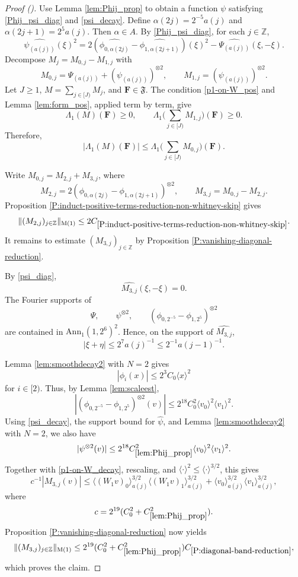 \documentclass[12pt,reqno]{amsart}
\newcommand{\auto}{{({\tiny\faCar})}}
\theoremstyle{plain}
\numberwithin{equation}{section}
\theoremstyle{remark}
\newcommand{\Z}{{\mathbb Z}}
\newcommand{\F}{\mathbf{F}}
\begin{document}
\begin{proof}[Proof \auto]
Use Lemma \ref{lem:Phij_prop} to obtain a function $\psi$ satisfying \eqref{Phij_psi_diag} and \eqref{psi_decay}. Define $\alpha(2j)=2^{-5}a(j)$ and $\alpha(2j+1)=2^5a(j)$. Then $\alpha\in A$. By \eqref{Phij_psi_diag}, for each $j\in\Z$,
\begin{equation}\label{psi_diag}
\widehat{\psi_{(a(j))}}(\xi)^2
=2(\widehat{\phi_{0,\alpha(2j)}}-\widehat{\phi_{1,\alpha(2j+1)}})(\xi)^2
-\widehat{\Psi_{(a(j))}}(\xi,-\xi).
\end{equation}
Decompose $M_j=M_{0,j}-M_{1,j}$ with
\[
M_{0,j}=\Psi_{(a(j))}+(\psi_{(a(j))})^{\otimes2},
\qquad
M_{1,j}=(\psi_{(a(j))})^{\otimes2}.
\]
Let $J\ge1$, $M=\sum_{j\in[J)}M_j$, and $\F\in\mathfrak F$. The condition \eqref{p1-on-W_pos} and Lemma \ref{lem:form_pos}, applied term by term, give
\[
\Lambda_1(M)(\F)\ge0,
\qquad
\Lambda_1\Big(\sum_{j\in[J)}M_{1,j}\Big)(\F)\ge0.
\]
Therefore,
\begin{equation}\label{K0_split}
|\Lambda_1(M)(\F)|
\le\Lambda_1\Big(\sum_{j\in[J)}M_{0,j}\Big)(\F).
\end{equation}

Write $M_{0,j}=M_{2,j}+M_{3,j}$, where
\[
M_{2,j}=2(\phi_{0,\alpha(2j)}-\phi_{1,\alpha(2j+1)})^{\otimes2},
\qquad
M_{3,j}=M_{0,j}-M_{2,j}.
\]
Proposition \ref{P:induct-positive-terms-reduction-non-whitney-skip} gives
\[
\|(M_{2,j})_{j\in\Z}\|_{\rm M(1)}
\le2C_{\ref{P:induct-positive-terms-reduction-non-whitney-skip}}.
\]
It remains to estimate $(M_{3,j})_{j\in\Z}$ by Proposition \ref{P:vanishing-diagonal-reduction}.

By \eqref{psi_diag},
\[
\widehat{M_{3,j}}(\xi,-\xi)=0.
\]
The Fourier supports of
\[
\Psi,
\qquad
\psi^{\otimes2},
\qquad
(\phi_{0,2^{-5}}-\phi_{1,2^5})^{\otimes2}
\]
are contained in $\mathrm{Ann}_1(1,2^6)^2$. Hence, on the support of $\widehat{M_{3,j}}$,
\begin{equation}\label{xi_plus_eta}
|\xi+\eta|\le2^7a(j)^{-1}\le2^{-1}a(j-1)^{-1}.
\end{equation}

Lemma \ref{lem:smoothdecay2} with $N=2$ gives
\[
|\phi_i(x)|\le2^3C_0\langle x\rangle^2
\]
for $i\in[2)$. Thus, by Lemma \ref{lem:scaleest},
\[
|(\phi_{0,2^{-5}}-\phi_{1,2^5})^{\otimes2}(v)|
\le2^{18}C_0^2\langle v_0\rangle^2\langle v_1\rangle^2.
\]
Using \eqref{psi_decay}, the support bound for $\widehat\psi$, and Lemma \ref{lem:smoothdecay2} with $N=2$, we also have
\begin{equation}\label{decay_2}
|\psi^{\otimes2}(v)|
\le2^{18}C_{\ref{lem:Phij_prop}}^2
\langle v_0\rangle^2\langle v_1\rangle^2.
\end{equation}
Together with \eqref{p1-on-W_decay}, rescaling, and $\langle\cdot\rangle^2\le\langle\cdot\rangle^{3/2}$, this gives
\[
c^{-1}|M_{3,j}(v)|
\le
\langle(W_1v)_0\rangle_{a(j)}^{3/2}
\langle(W_1v)_1\rangle_{a(j)}^{3/2}
+
\langle v_0\rangle_{a(j)}^{3/2}
\langle v_1\rangle_{a(j)}^{3/2},
\]
where
\[
c=2^{19}(C_0^2+C_{\ref{lem:Phij_prop}}^2).
\]
Proposition \ref{P:vanishing-diagonal-reduction} now yields
\[
\|(M_{3,j})_{j\in\Z}\|_{\rm M(1)}
\le2^{19}(C_0^2+C_{\ref{lem:Phij_prop}}^2)
C_{\ref{P:diagonal-band-reduction}},
\]
which proves the claim.
\end{proof}
\end{document}
